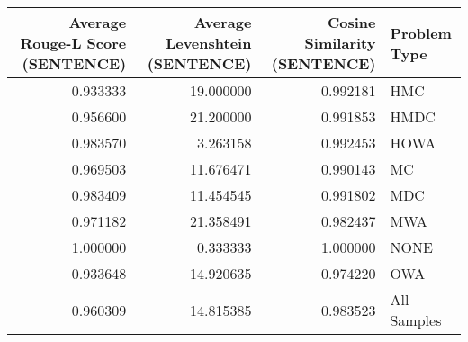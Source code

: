 \begin{tabular}{rrrl}
\toprule
Average Rouge-L Score (SENTENCE) & Average Levenshtein (SENTENCE) & Cosine Similarity (SENTENCE) & Problem Type \\
\midrule
0.933333 & 19.000000 & 0.992181 & HMC \\
0.956600 & 21.200000 & 0.991853 & HMDC \\
0.983570 & 3.263158 & 0.992453 & HOWA \\
0.969503 & 11.676471 & 0.990143 & MC \\
0.983409 & 11.454545 & 0.991802 & MDC \\
0.971182 & 21.358491 & 0.982437 & MWA \\
1.000000 & 0.333333 & 1.000000 & NONE \\
0.933648 & 14.920635 & 0.974220 & OWA \\
0.960309 & 14.815385 & 0.983523 & All Samples \\
\bottomrule
\end{tabular}
